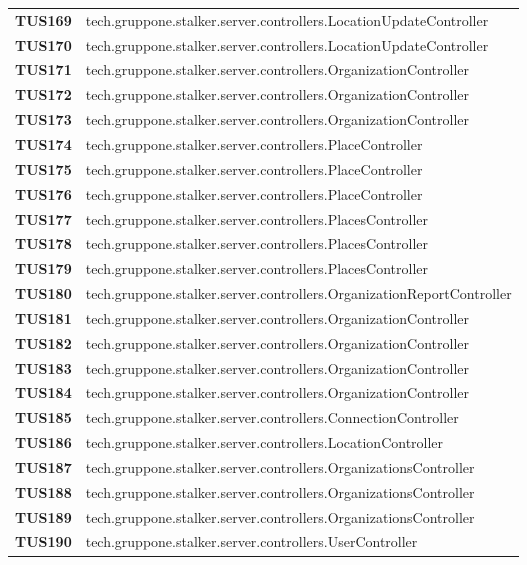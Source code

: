 \documentclass[../../piano-di-qualifica.tex]{subfiles}
\begin{document}
\begin{longtable}[H]{>{\centering\bfseries}m{3cm} >{}m{13cm}}

  TUS169 & tech.gruppone.stalker.server.controllers.LocationUpdateController \\
  TUS170 & tech.gruppone.stalker.server.controllers.LocationUpdateController \\
  TUS171 & tech.gruppone.stalker.server.controllers.OrganizationController \\
  TUS172 & tech.gruppone.stalker.server.controllers.OrganizationController \\
  TUS173 & tech.gruppone.stalker.server.controllers.OrganizationController \\
  TUS174 & tech.gruppone.stalker.server.controllers.PlaceController \\
  TUS175 & tech.gruppone.stalker.server.controllers.PlaceController \\
  TUS176 & tech.gruppone.stalker.server.controllers.PlaceController \\
  TUS177 & tech.gruppone.stalker.server.controllers.PlacesController \\
  TUS178 & tech.gruppone.stalker.server.controllers.PlacesController \\
  TUS179 & tech.gruppone.stalker.server.controllers.PlacesController \\
  TUS180 & tech.gruppone.stalker.server.controllers.OrganizationReportController \\
  TUS181 & tech.gruppone.stalker.server.controllers.OrganizationController \\
  TUS182 & tech.gruppone.stalker.server.controllers.OrganizationController \\
  TUS183 & tech.gruppone.stalker.server.controllers.OrganizationController \\
  TUS184 & tech.gruppone.stalker.server.controllers.OrganizationController \\
  TUS185 & tech.gruppone.stalker.server.controllers.ConnectionController \\
  TUS186 & tech.gruppone.stalker.server.controllers.LocationController \\
  TUS187 & tech.gruppone.stalker.server.controllers.OrganizationsController \\
  TUS188 & tech.gruppone.stalker.server.controllers.OrganizationsController \\
  TUS189 & tech.gruppone.stalker.server.controllers.OrganizationsController \\
  TUS190 & tech.gruppone.stalker.server.controllers.UserController \\

\end{longtable}
\end{document}
